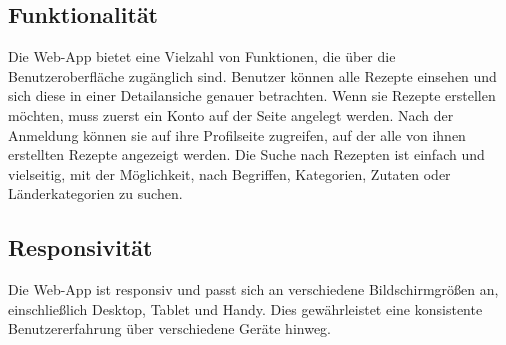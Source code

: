 \documentclass{article}
\begin{document}
\subsection{Funktionalität}
Die Web-App bietet eine Vielzahl von Funktionen, die über die Benutzeroberfläche zugänglich sind. Benutzer können alle Rezepte einsehen und sich diese in einer Detailansiche genauer betrachten. Wenn sie Rezepte erstellen möchten, muss zuerst ein Konto auf der Seite angelegt werden. Nach der Anmeldung können sie auf ihre Profilseite zugreifen, auf der alle von ihnen  erstellten Rezepte angezeigt werden.  Die Suche nach Rezepten ist einfach und vielseitig, mit der Möglichkeit, nach Begriffen, Kategorien, Zutaten oder Länderkategorien zu suchen.

\subsection{Responsivität}
Die Web-App ist responsiv und passt sich an verschiedene Bildschirmgrößen an, einschließlich Desktop, Tablet und Handy. Dies gewährleistet eine konsistente Benutzererfahrung über verschiedene Geräte hinweg.
\end{document}
